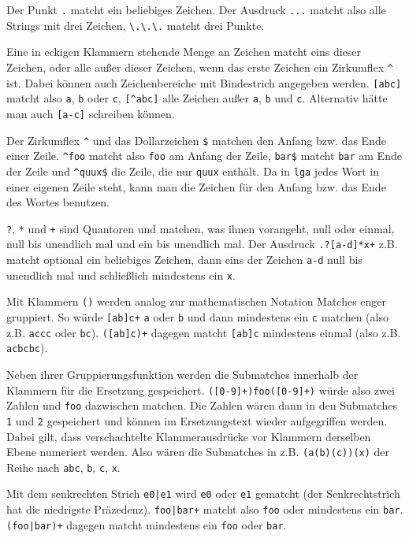 \documentclass[12pt,a4paper,normalheadings]{scrartcl}
\def\tt#1{\texttt{#1}}
\begin{document}
Der Punkt \tt{.} matcht ein beliebiges Zeichen.
Der Ausdruck \tt{...} matcht also alle Strings mit drei Zeichen,
\tt{\textbackslash.\textbackslash.\textbackslash.} matcht drei Punkte.

Eine in eckigen Klammern stehende Menge an Zeichen matcht eins dieser Zeichen,
oder alle außer dieser Zeichen,
wenn das erste Zeichen ein Zirkumflex \tt{\textasciicircum} ist.
Dabei können auch Zeichenbereiche mit Bindestrich angegeben werden.
\tt{[abc]} matcht also \tt{a}, \tt{b} oder \tt{c},
\tt{[\textasciicircum{}abc]} alle Zeichen außer \tt{a}, \tt{b} und \tt{c}.
Alternativ hätte man auch \tt{[a-c]} schreiben können.

Der Zirkumflex \tt{\textasciicircum} und das Dollarzeichen \tt{\$}
matchen den Anfang bzw. das Ende einer Zeile.
\tt{\textasciicircum{}foo} matcht also \tt{foo} am Anfang der Zeile,
\tt{bar\$} matcht \tt{bar} am Ende der Zeile
und \tt{\textasciicircum{}quux\$} die Zeile, die nur \tt{quux} enthält.
Da in \tt{lga} jedes Wort in einer eigenen Zeile steht,
kann man die Zeichen für den Anfang bzw. das Ende des Wortes benutzen.

\tt{?}, \tt{*} und \tt{+} sind Quantoren
und matchen, was ihnen vorangeht, null oder einmal, null bis unendlich mal
und ein bis unendlich mal.
Der Ausdruck \tt{.?[a-d]*x+} z.B.
matcht optional ein beliebiges Zeichen, dann eins der Zeichen \tt{a-d}
null bis unendlich mal und schließlich mindestens ein \tt{x}.

Mit Klammern \tt{()} werden analog zur mathematischen Notation
Matches enger gruppiert.
So würde \tt{[ab]c+} \tt{a} oder \tt{b} und dann mindestens ein
\tt{c} matchen (also z.B. \tt{accc} oder \tt{bc}).
\tt{([ab]c)+} dagegen matcht \tt{[ab]c} mindestens einmal
(also z.B. \tt{acbcbc}).

Neben ihrer Gruppierungsfunktion werden die Submatches innerhalb
der Klammern für die Ersetzung gespeichert.
\tt{([0-9]+)foo([0-9]+)} würde also zwei Zahlen und \tt{foo} dazwischen
matchen.
Die Zahlen wären dann in den Submatches \tt{1} und \tt{2} gespeichert
und können im Ersetzungstext wieder aufgegriffen werden.
Dabei gilt, dass verschachtelte Klammerausdrücke vor Klammern derselben
Ebene numeriert werden. Also wären die Submatches in z.B. \tt{(a(b)(c))(x)}
der Reihe nach \tt{abc}, \tt{b}, \tt{c}, \tt{x}.

Mit dem senkrechten Strich \tt{e0|e1} wird \tt{e0}
oder \tt{e1} gematcht (der Senkrechtstrich hat die niedrigste Präzedenz).
\tt{foo|bar+} matcht also \tt{foo} oder mindestens ein \tt{bar}.
\tt{(foo|bar)+} dagegen matcht mindestens ein \tt{foo} oder \tt{bar}.
\end{document}
